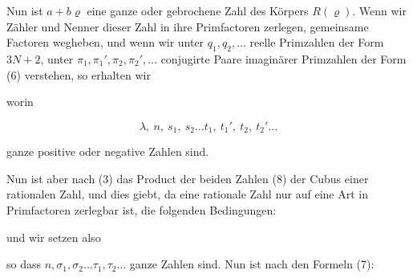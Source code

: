 
Nun ist $a + b\varrho$ eine ganze oder gebrochene Zahl des Körpers $R(\varrho)$.
Wenn wir Zähler und Nenner dieser Zahl in ihre Primfactoren zerlegen, gemeinsame
Factoren wegheben, und wenn wir unter $q_1, q_2, \ldots$ reelle Primzahlen der
Form $3N+2$, unter $\pi_1, \pi_1', \pi_2, \pi_2', \ldots$ conjugirte Paare
imaginärer Primzahlen der Form (6) verstehen, so erhalten wir


worin

\[
\lambda, \ n, \ s_1, \ s_2 \ldots t_1, \ t_1', \ t_2, \ t_2' \ldots
\]

ganze positive oder negative Zahlen sind.

Nun ist aber nach (3) das Product der beiden Zahlen (8) der Cubus einer
rationalen Zahl, und dies giebt, da eine rationale Zahl nur auf eine Art in
Primfactoren zerlegbar ist, die folgenden Bedingungen:


und wir setzen also


so dass $n, \sigma_1, \sigma_2 \ldots \tau_1, \tau_2 \ldots$ ganze Zahlen sind. %
Nun ist nach den Formeln (7):


